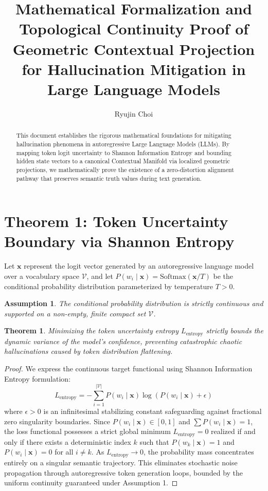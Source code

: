 \documentclass[10pt,journal]{IEEEtran}
\newtheorem{theorem}{Theorem}
\newtheorem{assumption}{Assumption}
\begin{document}
\title{Mathematical Formalization and Topological Continuity Proof of Geometric Contextual Projection for Hallucination Mitigation in Large Language Models}
\author{Ryujin Choi}
\maketitle
\begin{abstract}
This document establishes the rigorous mathematical foundations for mitigating hallucination phenomena in autoregressive Large Language Models (LLMs). By mapping token logit uncertainty to Shannon Information Entropy and bounding hidden state vectors to a canonical Contextual Manifold via localized geometric projections, we mathematically prove the existence of a zero-distortion alignment pathway that preserves semantic truth values during text generation.
\end{abstract}
\section{Theorem 1: Token Uncertainty Boundary via Shannon Entropy}
Let $\mathbf{x}$ represent the logit vector generated by an autoregressive language model over a vocabulary space $\mathcal{V}$, and let $P(w_i \mid \mathbf{x}) = \text{Softmax}(\mathbf{x} / T)$ be the conditional probability distribution parameterized by temperature $T > 0$.
\begin{assumption}
The conditional probability distribution is strictly continuous and supported on a non-empty, finite compact set $\mathcal{V}$.
\end{assumption}
\begin{theorem}
Minimizing the token uncertainty entropy $L_{\text{entropy}}$ strictly bounds the dynamic variance of the model's confidence, preventing catastrophic chaotic hallucinations caused by token distribution flattening.
\end{theorem}
\begin{proof}
We express the continuous target functional using Shannon Information Entropy formulation:
\begin{equation}
L_{\text{entropy}} = -\sum_{i=1}^{|\mathcal{V}|} P(w_i \mid \mathbf{x}) \log \left( P(w_i \mid \mathbf{x}) + \epsilon \right)
\end{equation}
where $\epsilon > 0$ is an infinitesimal stabilizing constant safeguarding against fractional zero singularity boundaries. Since $P(w_i \mid \mathbf{x}) \in [0, 1]$ and $\sum P(w_i \mid \mathbf{x}) = 1$, the loss functional possesses a strict global minimum $L_{\text{entropy}} = 0$ realized if and only if there exists a deterministic index $k$ such that $P(w_k \mid \mathbf{x}) = 1$ and $P(w_i \mid \mathbf{x}) = 0$ for all $i \neq k$. 
As $L_{\text{entropy}} \to 0$, the probability mass concentrates entirely on a singular semantic trajectory. This eliminates stochastic noise propagation through autoregressive token generation loops, bounded by the uniform continuity guaranteed under Assumption 1.
\end{proof}
\end{document}
